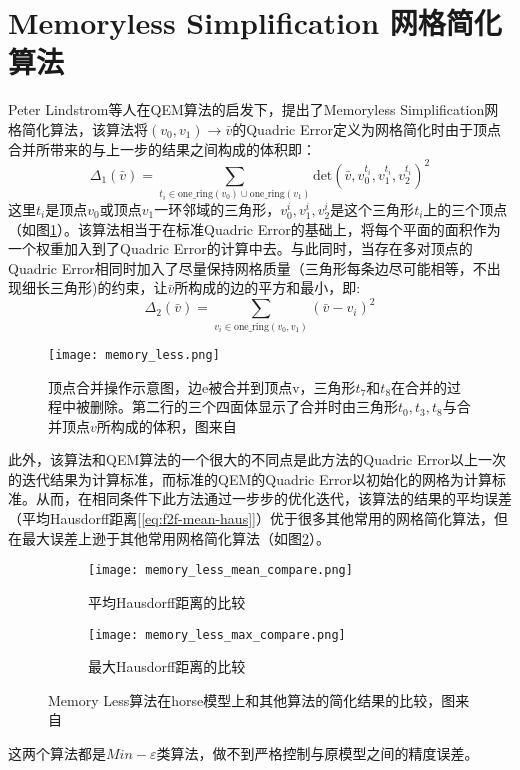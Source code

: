 \section{Memoryless Simplification 网格简化算法}
Peter Lindstrom等人在QEM算法的启发下，提出了Memoryless Simplification网格简化算法\cite{memory-less}，该算法将$(v_0,v_1) \to \bar{v}$的Quadric Error定义为网格简化时由于顶点合并所带来的与上一步的结果之间构成的体积即：
\begin{equation}
  \Delta_1(\bar{v}) = \sum_{t_i \in \text{one\_ring}(v_0) \cup \text{one\_ring}(v_1)} \text{det} (\bar{v},v_0^{t_i},v_1^{t_i},v_2^{t_i})^2
\end{equation}
这里$t_i$是顶点$v_0$或顶点$v_1$一环邻域的三角形，$v_0^i,v_1^i, v_2^i$是这个三角形$t_i$上的三个顶点（如图\ref{fig:memory-less}）。该算法相当于在标准Quadric Error的基础上，将每个平面的面积作为一个权重加入到了Quadric Error的计算中去。与此同时，当存在多对顶点的Quadric Error相同时加入了尽量保持网格质量（三角形每条边尽可能相等，不出现细长三角形)的约束，让$\bar{v}$所构成的边的平方和最小，即:
\begin{equation}
  \Delta_2(\bar{v}) = \sum_{v_i \in \text{one\_ring} (v_0,v_1)} (\bar{v}-v_i)^2
\end{equation}
\begin{figure}[htbp]
    \centering
    \texttt{[image: memory\_less.png]}
    \caption{顶点合并操作示意图，边e被合并到顶点v，三角形$t_7$和$t_8$在合并的过程中被删除。第二行的三个四面体显示了合并时由三角形$t_0,t_3,t_8$与合并顶点$v$所构成的体积，图来自\cite{memory-less}}
    \label{fig:memory-less}
\end{figure}
此外，该算法和QEM算法的一个很大的不同点是此方法的Quadric Error以上一次的迭代结果为计算标准，而标准的QEM的Quadric Error以初始化的网格为计算标准。从而，在相同条件下此方法通过一步步的优化迭代，该算法的结果的平均误差（平均Hausdorff距离[\ref{eq:f2f-mean-haus}]）优于很多其他常用的网格简化算法，但在最大误差上逊于其他常用网格简化算法（如图\ref{fig:memory-less-compare}）。
\begin{figure}[htbp]
  \centering
  \begin{subfigure}[b]{0.7\textwidth}
    \texttt{[image: memory\_less\_mean\_compare.png]}
    \caption[input]{平均Hausdorff距离的比较}
    \end{subfigure}
    \begin{subfigure}[b]{0.7\textwidth}
      \texttt{[image: memory\_less\_max\_compare.png]}
      \caption[mls]{最大Hausdorff距离的比较}
    \end{subfigure}
    \caption[Result]{Memory Less算法在horse模型上和其他算法的简化结果的比较，图来自\cite{memory-less}}
    \label{fig:memory-less-compare}
\end{figure}
这两个算法都是$Min-\varepsilon$类算法，做不到严格控制与原模型之间的精度误差。

